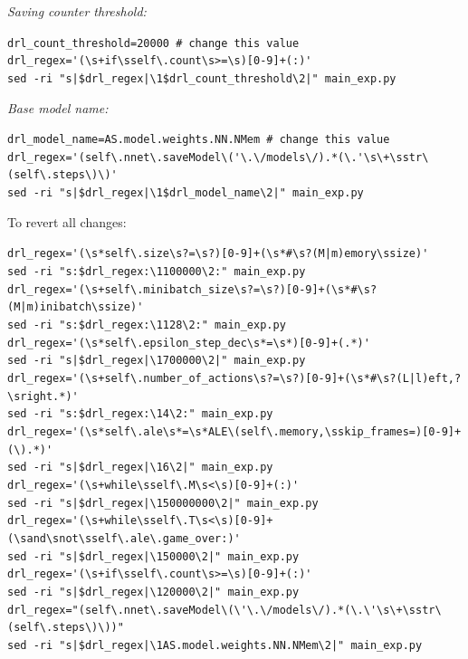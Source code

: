 \documentclass[a4paper,oneside,dvipsnames]{article}
\begin{document}
\textit{Saving counter threshold:}
\begin{tcolorbox}[width=\linewidth]
\verb!drl_count_threshold=20000 # change this value! \\
\verb!drl_regex='(\s+if\sself\.count\s>=\s)[0-9]+(:)'! \\
\verb!sed -ri "s|$drl_regex|\1$drl_count_threshold\2|" main_exp.py!
\end{tcolorbox}

\textit{Base model name:}
\begin{tcolorbox}[width=\linewidth]
\verb!drl_model_name=AS.model.weights.NN.NMem # change this value! \\
\verb!drl_regex='(self\.nnet\.saveModel\('\.\/models\/).*(\.'\s\+\sstr\(self\.steps\)\)'! \\
\verb!sed -ri "s|$drl_regex|\1$drl_model_name\2|" main_exp.py!
\end{tcolorbox}

To revert all changes:
\begin{tcolorbox}[width=\linewidth]
\verb!drl_regex='(\s*self\.size\s?=\s?)[0-9]+(\s*#\s?(M|m)emory\ssize)'! \\
\verb!sed -ri "s:$drl_regex:\1100000\2:" main_exp.py! \\
\verb!drl_regex='(\s+self\.minibatch_size\s?=\s?)[0-9]+(\s*#\s?(M|m)inibatch\ssize)'! \\
\verb!sed -ri "s:$drl_regex:\1128\2:" main_exp.py! \\
\verb!drl_regex='(\s*self\.epsilon_step_dec\s*=\s*)[0-9]+(.*)'! \\
\verb!sed -ri "s|$drl_regex|\1700000\2|" main_exp.py! \\
\verb!drl_regex='(\s+self\.number_of_actions\s?=\s?)[0-9]+(\s*#\s?(L|l)eft,?\sright.*)'! \\
\verb!sed -ri "s:$drl_regex:\14\2:" main_exp.py! \\
\verb!drl_regex='(\s*self\.ale\s*=\s*ALE\(self\.memory,\sskip_frames=)[0-9]+(\).*)'! \\
\verb!sed -ri "s|$drl_regex|\16\2|" main_exp.py! \\
\verb!drl_regex='(\s+while\sself\.M\s<\s)[0-9]+(:)'! \\
\verb!sed -ri "s|$drl_regex|\150000000\2|" main_exp.py! \\
\verb!drl_regex='(\s+while\sself\.T\s<\s)[0-9]+(\sand\snot\sself\.ale\.game_over:)'! \\
\verb!sed -ri "s|$drl_regex|\150000\2|" main_exp.py! \\
\verb!drl_regex='(\s+if\sself\.count\s>=\s)[0-9]+(:)'! \\
\verb!sed -ri "s|$drl_regex|\120000\2|" main_exp.py! \\
\verb!drl_regex="(self\.nnet\.saveModel\(\'\.\/models\/).*(\.\'\s\+\sstr\(self\.steps\)\))"! \\
\verb!sed -ri "s|$drl_regex|\1AS.model.weights.NN.NMem\2|" main_exp.py!
\end{tcolorbox}
\end{document}
